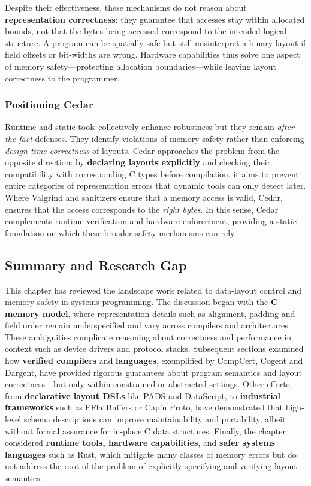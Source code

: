 Despite their effectiveness, these mechanisms do not reason about
\textbf{representation correctness}: they guarantee that accesses stay within
allocated bounds, not that the bytes being accessed correspond
to the intended logical structure. A program can be spatially safe
but still misinterpret a binary layout
if field offsets or bit-widths are wrong. Hardware capabilities thus solve
one aspect of memory safety—protecting allocation boundaries—while leaving
layout correctness to the programmer. 

\subsubsection{Positioning Cedar}
Runtime and static tools collectively enhance robustness but they remain
\textit{after-the-fact} defenses. They identify violations of memory
safety rather than enforcing \textit{design-time correctness} of layouts.
Cedar approaches the problem from the opposite direction: by
\textbf{declaring layouts explicitly} and checking their compatibility
with corresponding C types before compilation, it aims
to prevent entire categories of representation errors that dynamic tools
can only detect later. Where Valgrind and sanitizers
ensure that a memory access is valid, Cedar, ensures that the 
access corresponds to the \textit{right bytes}. In this sense,
Cedar complements runtime verification and hardware enforcement, providing a
static foundation on which these broader safety mechanisms can rely.


\subsection{Summary and Research Gap}
This chapter has reviewed the landscape work related to data-layout
control and memory safety in systems programming. The discussion
began with the \textbf{C memory model}, where representation
details such as alignment, padding and field order remain
underspecified and vary across compilers and architectures.
These ambiguities complicate reasoning about correctness and performance in
context such as device drivers and protocol stacks. Subsequent
sections examined how \textbf{verified compilers} and \textbf{languages},
exemplified by CompCert, Cogent and Dargent, have provided rigorous guarantees
about program semantics and layout correctness—but only within constrained or
abstracted settings. Other efforts, from \textbf{declarative layout DSLs} like
PADS and DataScript, to \textbf{industrial frameworks} such as FFlatBuffers
or Cap'n Proto, have demonstrated that high-level schema descriptions
can improve maintainability and portability, albeit without
formal assurance for in-place C data structures. Finally, the chapter
considered \textbf{runtime tools, hardware capabilities}, and \textbf{safer
systems languages} such as Rust, which mitigate many classes of memory errors
but do not address the root of the problem of explicitly specifying and
verifying layout semantics.

